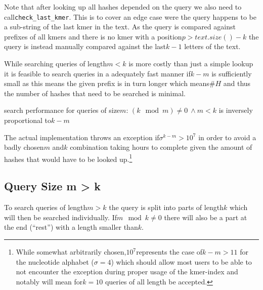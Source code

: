 Note that after looking up all hashes depended on the query we also
need to call\lstinline{check_last_kmer}. This is to cover an edge
case were the query happens to be a sub-string of the last kmer in
the text. As the query is compared against prefixes of all kmers and
there is no kmer with a position$p>text.size()-k$ the query is instead
manually compared against the last$k-1$ letters of the text.

While searching queries of length$m<k$ is more costly than just a
simple lookup it is feasible to search queries in a adequately fast
manner if$k-m$ is sufficiently small as this means the given prefix
is in turn longer which means$\#H$ and thus the number of hashes
that need to be searched is minimal.
\begin{lem}
\label{Lemma 2}search performance for queries of size$m:\,(k\mod m)\neq0\:\land m<k$
is inversely proportional to$k-m$
\end{lem}
The actual implementation throws an exception if$\sigma^{k-m}>10^{7}$
in order to avoid a badly chosen$m$ and$k$ combination taking hours
to complete given the amount of hashes that would have to be looked
up.\footnote{While somewhat arbitrarily chosen,$10^{7}$represents the case of$k-m>11$
for the nucleotide alphabet ($\sigma=4$) which should allow most
users to be able to not encounter the exception during proper usage
of the kmer-index and notably will mean for$k=10$ queries of all
length be accepted.}

\subsection{\label{section 3.3}Query Size m > k}

To search queries of length$m>k$ the query is split into parts of
length$k$ which will then be searched individually. If$m\mod k\neq0$
there will also be a part at the end (``rest'') with a length smaller
than$k$.

